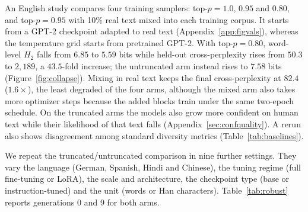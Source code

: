 \documentclass[10pt]{article}
\theoremstyle{plain}
\theoremstyle{definition}
\newcommand{\Htwo}{H_2}
\begin{document}
An English study compares four training samplers: top-$p=1.0$, $0.95$ and $0.80$, and
top-$p=0.95$ with 10\% real text mixed into each training corpus. It starts from a GPT-2
checkpoint adapted to real text (Appendix~\ref{app:figvals}), whereas the temperature grid
starts from pretrained GPT-2. With top-$p=0.80$, word-level $\Htwo$ falls from $6.85$ to
$5.59$ bits while held-out cross-perplexity rises from $50.3$ to $2{,}189$, a $43.5$-fold
increase; the untruncated arm instead rises to $7.58$ bits (Figure~\ref{fig:collapse}). Mixing
in real text keeps the final cross-perplexity at $82.4$ ($1.6\times$), the least degraded of the
four arms, although the mixed arm also takes more optimizer steps because the added blocks train
under the same two-epoch schedule. On the truncated arms the models also grow more confident on
human text while their likelihood of that text falls (Appendix~\ref{sec:confquality}). A rerun also shows disagreement among standard diversity metrics (Table~\ref{tab:baselines}).



We repeat the truncated/untruncated comparison in nine further settings. They vary the language
(German, Spanish, Hindi and Chinese), the tuning regime (full fine-tuning or LoRA), the scale and
architecture, the checkpoint type (base or
instruction-tuned) and the unit (words or Han characters). Table~\ref{tab:robust} reports
generations 0 and 9 for both arms.
\end{document}
